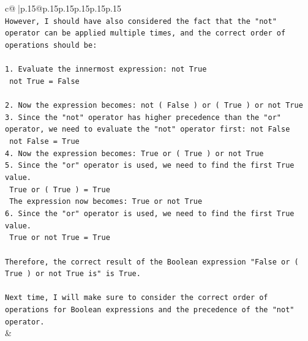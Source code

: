 \documentclass{article}
\begin{document}
{\begin{supertabular}{c@{$\;$}|p{.15\linewidth}@{}p{.15\linewidth}p{.15\linewidth}p{.15\linewidth}p{.15\linewidth}p{.15\linewidth}}
{{{\\ 
\texttt{However, I should have also considered the fact that the "not" operator can be applied multiple times, and the correct order of operations should be:} \\
\\ 
\texttt{1. Evaluate the innermost expression: not True} \\
\texttt{   not True = False} \\
\\ 
\texttt{2. Now the expression becomes: not ( False ) or ( True ) or not True} \\
\texttt{3. Since the "not" operator has higher precedence than the "or" operator, we need to evaluate the "not" operator first: not False} \\
\texttt{   not False = True} \\
\texttt{4. Now the expression becomes: True or ( True ) or not True} \\
\texttt{5. Since the "or" operator is used, we need to find the first True value. } \\
\texttt{   True or ( True ) = True} \\
\texttt{   The expression now becomes: True or not True} \\
\texttt{6. Since the "or" operator is used, we need to find the first True value. } \\
\texttt{   True or not True = True} \\
\\ 
\texttt{Therefore, the correct result of the Boolean expression "False or ( True ) or not True is" is True. } \\
\\ 
\texttt{Next time, I will make sure to consider the correct order of operations for Boolean expressions and the precedence of the "not" operator.} \\
            }
        }
    }
    & \\ \\

\end{supertabular}
}
\end{document}
